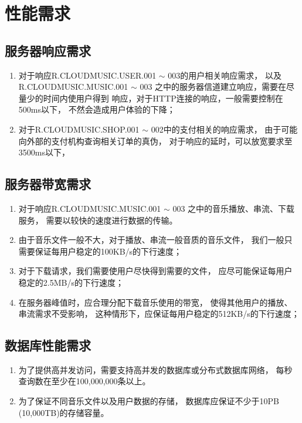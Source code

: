 \section{性能需求}

\subsection{服务器响应需求}
\begin{enumerate}
	\item 对于响应R.CLOUDMUSIC.USER.001 $\sim$ 003的用户相关响应需求，
		以及R.CLOUDMUSIC.MUSIC.001 $\sim$ 003
		之中的服务器信道建立响应，需要在尽量少的时间内使用户得到
		响应，对于HTTP连接的响应，一般需要控制在500ms以下，
		不然会造成用户体验的下降；
	\item 对于R.CLOUDMUSIC.SHOP.001 $\sim$ 002中的支付相关的响应需求，
		由于可能向外部的支付机构查询相关订单的真伪，
		对于响应的延时，可以放宽要求至3500ms以下，
\end{enumerate}

\subsection{服务器带宽需求}
\begin{enumerate}
	\item 对于响应R.CLOUDMUSIC.MUSIC.001 $\sim$ 003
		之中的音乐播放、串流、下载服务，
		需要以较快的速度进行数据的传输。
	\item 由于音乐文件一般不大，对于播放、串流一般音质的音乐文件，
		我们一般只需要保证每用户稳定的100KB/s的下行速度；
	\item 对于下载请求，我们需要使用户尽快得到需要的文件，
		应尽可能保证每用户稳定的2.5MB/s的下行速度；
	\item 在服务器峰值时，应合理分配下载音乐使用的带宽，
		使得其他用户的播放、串流需求不受影响，
		这种情形下，应保证每用户稳定的512KB/s的下行速度；
\end{enumerate}

\subsection{数据库性能需求}
\begin{enumerate}
	\item 为了提供高并发访问，需要支持高并发的数据库或分布式数据库网络，
		每秒查询数在至少在100,000,000条以上。
	\item 为了保证不同音乐文件以及用户数据的存储，
		数据库应保证不少于10PB (10,000TB)的存储容量。
\end{enumerate}

